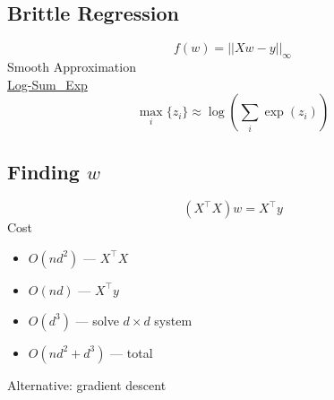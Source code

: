 \documentclass[10pt,landscape,a4paper]{article}
\begin{document}
\begin{multicols*}{5}
\subsection{Brittle Regression}
\begin{dmath*}
    f(w) = ||Xw - y||_{\infty}
\end{dmath*}
Smooth Approximation \\
\underline{Log-Sum_Exp}
\begin{dmath*}
    \max_i \{z_i\} \approx \log(\sum_i \exp(z_i))
\end{dmath*}

\subsection{Finding \(w\)}
\begin{dmath*}
    (X^\intercal X) w = X^\intercal y
\end{dmath*}
Cost
\begin{itemize}
    \item \(O(nd^2)\) --- \(X^\intercal X\)
    \item \(O(nd)\) --- \(X^\intercal y\)
    \item \(O(d^3)\) --- solve \(d \times d\) system
    \item \(O(nd^2 + d^3)\) --- total
\end{itemize}
Alternative: gradient descent


\end{multicols*}
\end{document}
